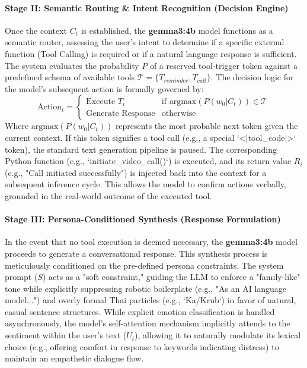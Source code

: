 \paragraph{Stage II: Semantic Routing \& Intent Recognition (Decision Engine)}
Once the context $C_t$ is established, the \textbf{gemma3:4b} model functions as a semantic router, assessing the user's intent to determine if a specific external function (Tool Calling) is required or if a natural language response is sufficient. The system evaluates the probability $P$ of a reserved tool-trigger token against a predefined schema of available tools $\mathcal{T} = \{T_{reminder}, T_{call}\}$. The decision logic for the model's subsequent action is formally governed by:
\begin{equation}
    \text{Action}_t = \begin{cases} 
    \text{Execute } T_i & \text{if } \text{argmax}(P(w_0|C_t)) \in \mathcal{T} \\
    \text{Generate Response} & \text{otherwise}
    \end{cases}
\end{equation}
Where $\text{argmax}(P(w_0|C_t))$ represents the most probable next token given the current context. If this token signifies a tool call (e.g., a special `<|tool\_code|>` token), the standard text generation pipeline is paused. The corresponding Python function (e.g., `initiate\_video\_call()`) is executed, and its return value $R_i$ (e.g., "Call initiated successfully") is injected back into the context for a subsequent inference cycle. This allows the model to confirm actions verbally, grounded in the real-world outcome of the executed tool.

\paragraph{Stage III: Persona-Conditioned Synthesis (Response Formulation)}
In the event that no tool execution is deemed necessary, the \textbf{gemma3:4b} model proceeds to generate a conversational response. This synthesis process is meticulously conditioned on the pre-defined persona constraints. The system prompt ($S$) acts as a "soft constraint," guiding the LLM to enforce a "family-like" tone while explicitly suppressing robotic boilerplate (e.g., "As an AI language model...") and overly formal Thai particles (e.g., `Ka/Krub`) in favor of natural, casual sentence structures. While explicit emotion classification is handled asynchronously, the model's self-attention mechanism implicitly attends to the sentiment within the user's text ($U_t$), allowing it to naturally modulate its lexical choice (e.g., offering comfort in response to keywords indicating distress) to maintain an empathetic dialogue flow. 

